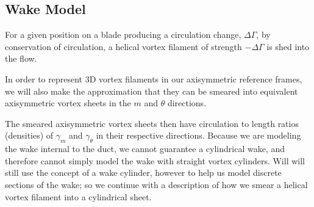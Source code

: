 

\subsection{Wake Model}
\label{sec:wakevorticity}

For a given position on a blade producing a circulation change,  \(\Delta \Gamma\), by conservation of circulation, a helical vortex filament of strength \(-\Delta \Gamma\) is shed into the flow.


In order to represent 3D vortex filaments in our axisymmetric reference frames, we will also make the approximation that they can be smeared into equivalent axisymmetric vortex sheets in the \(m\) and \(\theta\) directions.
%
\begin{assumption}




\end{assumption}
%
The smeared axisymmetric vortex sheets then have circulation to length ratios (densities) of \(\gamma_m\) and \(\gamma_\theta\) in their respective directions.
%
Because we are modeling the wake internal to the duct, we cannot guarantee a cylindrical wake, and therefore cannot simply model the wake with straight vortex cylinders.
%
Will will still use the concept of a wake cylinder, however to help us model discrete sections of the wake; so we continue with a description of how we smear a helical vortex filament into a cylindrical sheet.




